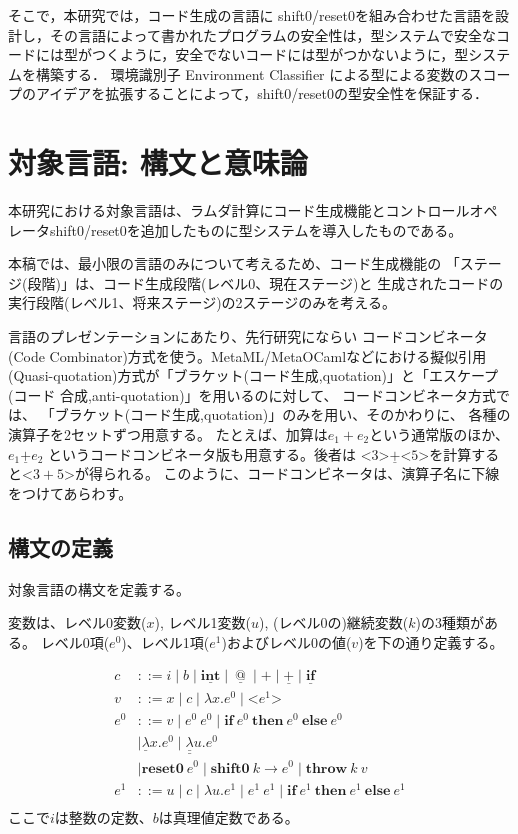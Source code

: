 \documentclass[T]{compsoft}
\makeatletter
\newcommand\fun[2]{\lambda{#1}.{#2}}
\newcommand\Resetz{\textbf{reset0}}
\newcommand\Shiftz{\textbf{shift0}}
\newcommand\Throw{\textbf{throw}}
\newcommand\resetz[1]{\Resetz~{#1}}
\newcommand\shiftz[2]{\Shiftz~{#1}\to{#2}}
\newcommand\throw[2]{\Throw~{#1}~{#2}}
\newcommand\cfun[2]{\underline{\lambda}{#1}.{#2}}
\newcommand\ccfun[2]{\underline{\underline{\lambda}}{#1}.{#2}}
\newcommand\cPlus{\underline{\textbf{+}}}
\newcommand\cint{\underline{\textbf{int}}}
\newcommand\code[1]{\texttt{<}{#1}\texttt{>}}
\newcommand\ift[3]{\textbf{if}~{#1}~\textbf{then}~{#2}~\textbf{else}~{#3}}
\newcommand\cIf{\underline{\textbf{if}}}
\newcommand\cat{~\underline{@}~}
\theoremstyle{break}
\makeatother
\begin{document}
そこで，本研究では，コード生成の言語に shift0/reset0を組み合わせた言語を設計し，その言語によって書かれたプログラムの安全性は，型システムで安全なコードには型がつくように，安全でないコードには型がつかないように，型システムを構築する．
環境識別子 Environment Classifier による型による変数のスコープのアイデア\cite{Sudo2014,Taha:2003:EC:604131.604134}を拡張することによって，shift0/reset0の型安全性を保証する．

\section{対象言語: 構文と意味論}

本研究における対象言語は、ラムダ計算にコード生成機能とコントロールオペ
レータshift0/reset0を追加したものに型システムを導入したものである。

本稿では、最小限の言語のみについて考えるため、コード生成機能の
「ステージ(段階)」は、コード生成段階(レベル0、現在ステージ)と
生成されたコードの実行段階(レベル1、将来ステージ)の2ステージのみを考える。

言語のプレゼンテーションにあたり、先行研究にならい
コードコンビネータ(Code Combinator)方式を使う。MetaML/MetaOCamlなどにおける擬似引用
(Quasi-quotation)方式が「ブラケット(コード生成,quotation)」と「エスケープ(コード
合成,anti-quotation)」を用いるのに対して、
コードコンビネータ方式では、
「ブラケット(コード生成,quotation)」のみを用い、そのかわりに、
各種の演算子を2セットずつ用意する。
たとえば、加算は$e_1+e_2$という通常版のほか、
$e_1 \cPlus e_2$ というコードコンビネータ版も用意する。後者は
$\code{3} \cPlus \code{5}$を計算すると$\code{3+5}$が得られる。
このように、コードコンビネータは、演算子名に下線をつけてあらわす。

\subsection{構文の定義}

対象言語の構文を定義する。

変数は、レベル0変数($x$), レベル1変数($u$),
(レベル0の)継続変数($k$)の3種類がある。
レベル0項($e^0$)、レベル1項($e^1$)およびレベル0の値($v$)を下の通り定義する。

\begin{align*}
  c & ::= i \mid b \mid \cint 
         \mid \cat \mid + \mid \cPlus \mid \cIf \\
  v & ::= x \mid c \mid \fun{x}{e^0} \mid \code{e^1} \\
  e^0 & ::=  v  \mid e^0~ e^0 \mid \ift{e^0}{e^0}{e^0} \\
    & \mid \cfun{x}{e^0}
      \mid \ccfun{u}{e^0} \\
    & \mid \resetz{e^0}
      \mid \shiftz{k}{e^0}
      \mid \throw{k}{v} \\
  e^1 & ::=  u \mid c \mid \fun{u}{e^1} \mid e^1~ e^1 
      \mid \ift{e^1}{e^1}{e^1} \\
\end{align*}
ここで$i$は整数の定数、$b$は真理値定数である。
\end{document}

